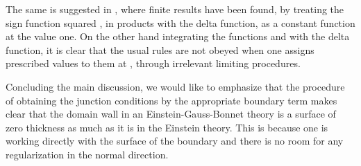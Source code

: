\documentclass[a4paper,a4paper]{article}
\begin{document}
 The same is suggested in \coordHE{}, where
finite results have been found, by treating the sign function squared \coordHE{}, in products
with the delta function, as a constant function at the value one. On the other hand 
integrating the functions \coordHE{} and \coordHE{} with the delta function, it is clear that
the usual rules are not obeyed when one assigns prescribed values to them at \coordHE{}, through
irrelevant limiting procedures. 

Concluding the main discussion, we would like to emphasize that the procedure of obtaining the junction conditions
by the appropriate boundary term makes clear that the domain wall in an Einstein-Gauss-Bonnet theory
is a surface of zero thickness as much as it is in the Einstein theory. This is because 
one is working directly with the surface of the boundary and there is no room
for any regularization in the normal direction.
\end{document}
